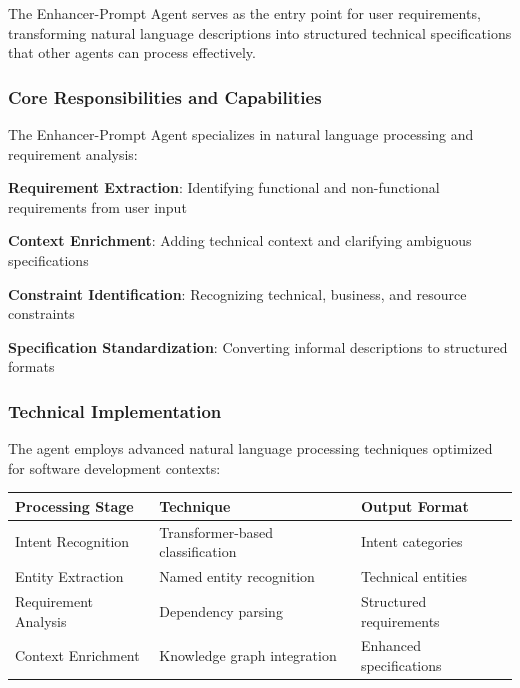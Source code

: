 The Enhancer-Prompt Agent serves as the entry point for user requirements, transforming natural language descriptions into structured technical specifications that other agents can process effectively.

\subsubsection*{Core Responsibilities and Capabilities}

The Enhancer-Prompt Agent specializes in natural language processing and requirement analysis:

\begin{compactlist}
    \item \textbf{Requirement Extraction}: Identifying functional and non-functional requirements from user input
    \item \textbf{Context Enrichment}: Adding technical context and clarifying ambiguous specifications
    \item \textbf{Constraint Identification}: Recognizing technical, business, and resource constraints
    \item \textbf{Specification Standardization}: Converting informal descriptions to structured formats
\end{compactlist}

\subsubsection*{Technical Implementation}

The agent employs advanced natural language processing techniques optimized for software development contexts:

\begin{center}
\begin{tabular}{@{}lll@{}}
\toprule
\textbf{Processing Stage} & \textbf{Technique} & \textbf{Output Format} \\
\midrule
Intent Recognition & Transformer-based classification & Intent categories \\
Entity Extraction & Named entity recognition & Technical entities \\
Requirement Analysis & Dependency parsing & Structured requirements \\
Context Enrichment & Knowledge graph integration & Enhanced specifications \\
\bottomrule
\end{tabular}
\end{center}

